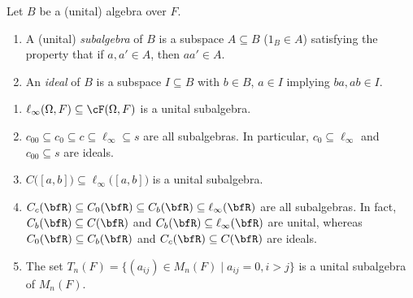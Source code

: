     \begin{definition}
        Let $B$ be a (unital) algebra over $F$.
        \begin{enumerate}[label = (\arabic*),itemsep=1pt,topsep=3pt]
            \item A (unital) \textit{subalgebra} of $B$ is a subspace $A \subseteq B$ ($1_B \in A$) satisfying the property that if $a,a' \in A$, then $aa' \in A$.
            \item An \textit{ideal} of $B$ is a subspace $I \subseteq B$ with $b \in B$, $a \in I$ implying $ba,ab \in I$.
        \end{enumerate} 
    \end{definition}

    \begin{example}
        \phantom{a}
        \begin{enumerate}[label = (\arabic*),itemsep=1pt,topsep=3pt]
            \item $\ell_\infty(\Omega,F) \subseteq \cF(\Omega,F)$ is a unital subalgebra.
            \item $c_{00} \subseteq c_0 \subseteq c \subseteq \ell_\infty \subseteq s$ are all subalgebras. In particular, $c_0 \subseteq \ell_\infty$ and $c_{00} \subseteq s$ are ideals.
            \item $C\bigl([a,b]\bigr) \subseteq \ell_\infty\bigl([a,b]\bigr)$ is a unital subalgebra.
            \item $C_c(\bfR) \subseteq C_0(\bfR) \subseteq C_b(\bfR) \subseteq \ell_\infty(\bfR)$ are all subalgebras. In fact, $C_b(\bfR) \subseteq C(\bfR)$ and $C_b(\bfR) \subseteq \ell_\infty(\bfR)$ are unital, whereas $C_0(\bfR) \subseteq C_b(\bfR)$ and $C_c(\bfR) \subseteq C(\bfR)$ are ideals.
            \item The set $T_n(F) = \{(a_{ij}) \in M_n(F) \mid a_{ij} = 0, i> j\}$ is a unital subalgebra of $M_n(F)$.
        \end{enumerate}
    \end{example}

